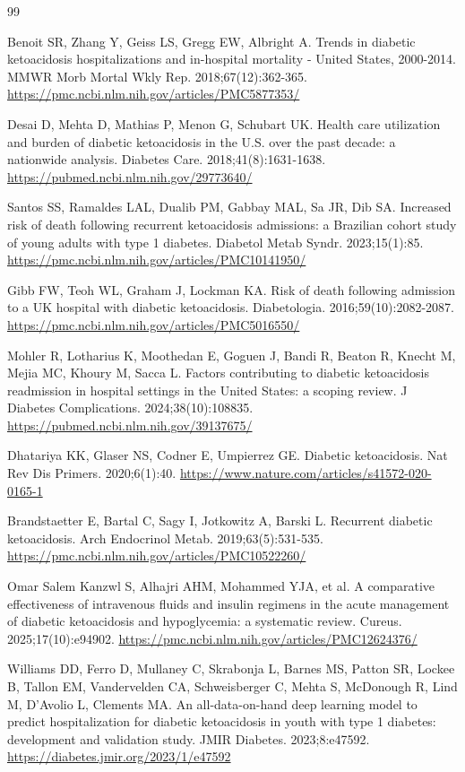 \documentclass[12pt,a4paper]{article}
\begin{document}
\begin{thebibliography}{99}

 Benoit SR, Zhang Y, Geiss LS, Gregg EW, Albright A. Trends in diabetic
ketoacidosis hospitalizations and in-hospital mortality - United States, 2000-2014. MMWR Morb
Mortal Wkly Rep. 2018;67(12):362-365. \url{https://pmc.ncbi.nlm.nih.gov/articles/PMC5877353/}

 Desai D, Mehta D, Mathias P, Menon G, Schubart UK. Health care utilization and
burden of diabetic ketoacidosis in the U.S. over the past decade: a nationwide analysis.
Diabetes Care. 2018;41(8):1631-1638. \url{https://pubmed.ncbi.nlm.nih.gov/29773640/}

 Santos SS, Ramaldes LAL, Dualib PM, Gabbay MAL, Sa JR, Dib SA. Increased risk of
death following recurrent ketoacidosis admissions: a Brazilian cohort study of young adults
with type 1 diabetes. Diabetol Metab Syndr. 2023;15(1):85.
\url{https://pmc.ncbi.nlm.nih.gov/articles/PMC10141950/}

 Gibb FW, Teoh WL, Graham J, Lockman KA. Risk of death following admission to a UK
hospital with diabetic ketoacidosis. Diabetologia. 2016;59(10):2082-2087.
\url{https://pmc.ncbi.nlm.nih.gov/articles/PMC5016550/}

 Mohler R, Lotharius K, Moothedan E, Goguen J, Bandi R, Beaton R, Knecht M,
Mejia MC, Khoury M, Sacca L. Factors contributing to diabetic ketoacidosis readmission in
hospital settings in the United States: a scoping review. J Diabetes Complications.
2024;38(10):108835. \url{https://pubmed.ncbi.nlm.nih.gov/39137675/}

 Dhatariya KK, Glaser NS, Codner E, Umpierrez GE. Diabetic ketoacidosis. Nat Rev
Dis Primers. 2020;6(1):40. \url{https://www.nature.com/articles/s41572-020-0165-1}

 Brandstaetter E, Bartal C, Sagy I, Jotkowitz A, Barski L. Recurrent diabetic
ketoacidosis. Arch Endocrinol Metab. 2019;63(5):531-535.
\url{https://pmc.ncbi.nlm.nih.gov/articles/PMC10522260/}

 Omar Salem Kanzwl S, Alhajri AHM, Mohammed YJA, et al. A comparative
effectiveness of intravenous fluids and insulin regimens in the acute management of diabetic
ketoacidosis and hypoglycemia: a systematic review. Cureus. 2025;17(10):e94902.
\url{https://pmc.ncbi.nlm.nih.gov/articles/PMC12624376/}

 Williams DD, Ferro D, Mullaney C, Skrabonja L, Barnes MS, Patton SR, Lockee B,
Tallon EM, Vandervelden CA, Schweisberger C, Mehta S, McDonough R, Lind M, D'Avolio L,
Clements MA. An all-data-on-hand deep learning model to predict hospitalization for diabetic
ketoacidosis in youth with type 1 diabetes: development and validation study. JMIR Diabetes.
2023;8:e47592. \url{https://diabetes.jmir.org/2023/1/e47592}


\end{thebibliography}
\end{document}
